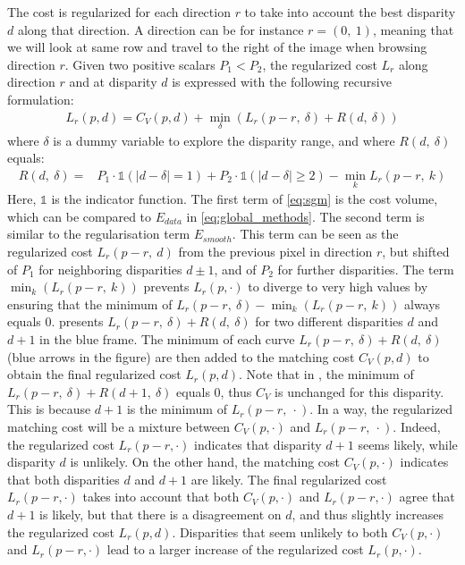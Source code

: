 The cost is regularized for each direction $r$ to take into account the best disparity $d$ along that direction. A direction can be for instance $r=(0,~1)$, meaning that we will look at same row and travel to the right of the image when browsing direction $r$. Given two positive scalars $P_1<P_2$, the regularized cost $L_r$ along direction $r$ and at disparity $d$ is expressed with the following recursive formulation:
\begin{align}\label{eq:sgm}
    L_r(p,d) = C_V(p,d) + \min_\delta \left(L_r(p-r,~\delta) + R(d, ~\delta)\right)
\end{align}
where $\delta$ is a dummy variable to explore the disparity range, and where $R(d, ~\delta)$ equals:
\begin{align}
    R(d, ~\delta) = &P_1\cdot\mathds{1}(|d-\delta|=1) + P_2\cdot\mathds{1}(|d-\delta|\geqslant 2) - \min_k L_r(p-r,~k) \label{eq:sgm_penalties}
\end{align}
Here, $\mathds{1}$ is the indicator function. The first term of \cref{eq:sgm} is the cost volume, which can be compared to $E_{data}$ in \cref{eq:global_methods}. The second term is similar to the regularisation term $E_{smooth}$. This term can be seen as the regularized cost $L_r(p-r, ~d)$ from the previous pixel in direction $r$, but shifted of $P_1$ for neighboring disparities $d\pm1$, and of $P_2$ for further disparities. The term $\min_k(L_r(p-r,~k))$ prevents $L_r(p,\cdot)$ to diverge to very high values by ensuring that the minimum of $L_r(p-r,~\delta) - \min_k(L_r(p-r,~k))$ always equals $0$.  presents $L_r(p-r,~\delta) + R(d, ~\delta)$ for two different disparities $d$ and $d+1$ in the blue frame. The minimum of each curve $L_r(p-r,~\delta) + R(d, ~\delta)$ (blue arrows in the figure) are then added to the matching cost $C_V(p,d)$ to obtain the final regularized cost $L_r(p,d)$. Note that in , the minimum of $L_r(p-r,~\delta)+R(d+1, ~\delta)$ equals $0$, thus $C_V$ is unchanged for this disparity. This is because $d+1$ is the minimum of $L_r(p-r,~\cdot)$. In a way, the regularized matching cost will be a mixture between $C_V(p,\cdot)$ and $L_r(p-r,~\cdot)$. Indeed, the regularized cost $L_r(p-r,\cdot)$ indicates that disparity $d+1$ seems likely, while disparity $d$ is unlikely. On the other hand, the matching cost $C_V(p,\cdot)$ indicates that both disparities $d$ and $d+1$ are likely. The final regularized cost $L_r(p-r,\cdot)$ takes into account that both $C_V(p,\cdot)$ and $L_r(p-r,\cdot)$ agree that $d+1$ is likely, but that there is a disagreement on $d$, and thus slightly increases the regularized cost $L_r(p,d)$. Disparities that seem unlikely to both $C_V(p,\cdot)$ and $L_r(p-r,\cdot)$ lead to a larger increase of the regularized cost $L_r(p,\cdot)$.

